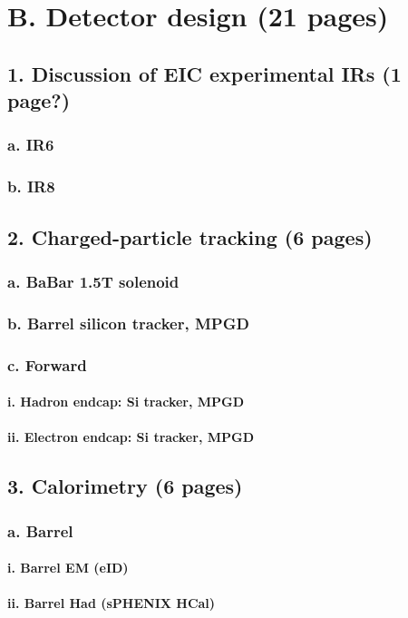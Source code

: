 \documentclass{report}
\begin{document}
\section{B. Detector design (21 pages)}
\subsection{1. Discussion of EIC experimental IRs (1 page?)}
\subsubsection{a. IR6}
\subsubsection{b. IR8}
\subsection{2. Charged-particle tracking (6 pages)}
\subsubsection{a. BaBar 1.5T solenoid}
\subsubsection{b. Barrel silicon tracker, MPGD}
\subsubsection{c. Forward}
\paragraph{i. Hadron endcap: Si tracker, MPGD}
\paragraph{ii. Electron endcap: Si tracker, MPGD}
\subsection{3. Calorimetry (6 pages)}
\subsubsection{a. Barrel}
\paragraph{i. Barrel EM (eID)}
\paragraph{ii. Barrel Had (sPHENIX HCal)}
\end{document}
